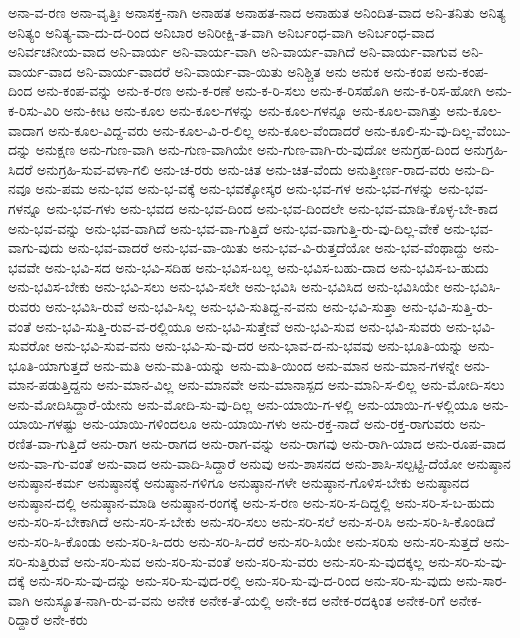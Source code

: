 ಅನಾ-ವ-ರಣ
ಅನಾ-ವೃತ್ತಿಃ
ಅನಾಸಕ್ತ-ನಾಗಿ
ಅನಾಹತ
ಅನಾಹತ-ನಾದ
ಅನಾಹುತ
ಅನಿಂದಿತ-ವಾದ
ಅನಿ-ತನಿತು
ಅನಿತ್ಯ
ಅನಿತ್ಯಂ
ಅನಿತ್ಯ-ವಾ-ದು-ದ-ರಿಂದ
ಅನಿಬಾರ
ಅನಿರೀಕ್ಷಿ-ತ-ವಾಗಿ
ಅನಿರ್ಬಂಧ-ವಾಗಿ
ಅನಿರ್ಬಂಧ-ವಾದ
ಅನಿರ್ವಚನೀಯ-ವಾದ
ಅನಿ-ವಾರ್ಯ
ಅನಿ-ವಾರ್ಯ-ವಾಗಿ
ಅನಿ-ವಾರ್ಯ-ವಾಗಿದೆ
ಅನಿ-ವಾರ್ಯ-ವಾಗುವ
ಅನಿ-ವಾರ್ಯ-ವಾದ
ಅನಿ-ವಾರ್ಯ-ವಾದರೆ
ಅನಿ-ವಾರ್ಯ-ವಾ-ಯಿತು
ಅನಿಶ್ಚಿತ
ಅನು
ಅನುಕ
ಅನು-ಕಂಪ
ಅನು-ಕಂಪ-ದಿಂದ
ಅನು-ಕಂಪ-ವನ್ನು
ಅನು-ಕ-ರಣ
ಅನು-ಕ-ರಣೆ
ಅನು-ಕ-ರಿ-ಸಲು
ಅನು-ಕ-ರಿಸಹೊಗಿ
ಅನು-ಕ-ರಿಸ-ಹೋಗಿ
ಅನು-ಕ-ರಿಸು-ವಿರಿ
ಅನು-ಕೀಟ
ಅನು-ಕೂಲ
ಅನು-ಕೂಲ-ಗಳನ್ನು
ಅನು-ಕೂಲ-ಗಳನ್ನೂ
ಅನು-ಕೂಲ-ವಾಗಿತ್ತು
ಅನು-ಕೂಲ-ವಾದಾಗ
ಅನು-ಕೂಲ-ವಿದ್ದ-ವರು
ಅನು-ಕೂಲ-ವಿ-ರ-ಲಿಲ್ಲ
ಅನು-ಕೂಲ-ವೆಂದಾದರೆ
ಅನು-ಕೂಲಿ-ಸು-ವು-ದಿಲ್ಲ-ವೆಂಬು-ದನ್ನು
ಅನುಕ್ಷಣ
ಅನು-ಗುಣ-ವಾಗಿ
ಅನು-ಗುಣ-ವಾಗಿಯೇ
ಅನು-ಗುಣ-ವಾಗಿ-ರು-ವುದೋ
ಅನುಗ್ರಹ-ದಿಂದ
ಅನುಗ್ರಹಿ-ಸಿದರೆ
ಅನುಗ್ರಹಿ-ಸುವ-ವಳಾ-ಗಲಿ
ಅನು-ಚ-ರರು
ಅನು-ಚಿತ
ಅನು-ಚಿತ-ವೆಂದು
ಅನುತ್ತೀರ್ಣ-ರಾದ-ವರು
ಅನು-ದಿ-ನವೂ
ಅನು-ಪಮ
ಅನು-ಭವ
ಅನು-ಭ-ವಕ್ಕೆ
ಅನು-ಭವಕ್ಕೋಸ್ಕರ
ಅನು-ಭವ-ಗಳ
ಅನು-ಭವ-ಗಳನ್ನು
ಅನು-ಭವ-ಗಳನ್ನೂ
ಅನು-ಭವ-ಗಳು
ಅನು-ಭವದ
ಅನು-ಭವ-ದಿಂದ
ಅನು-ಭವ-ದಿಂದಲೇ
ಅನು-ಭವ-ಮಾಡಿ-ಕೊಳ್ಳ-ಬೇ-ಕಾದ
ಅನು-ಭವ-ವನ್ನು
ಅನು-ಭವ-ವಾಗಿದೆ
ಅನು-ಭವ-ವಾ-ಗುತ್ತಿದೆ
ಅನು-ಭವ-ವಾಗುತ್ತಿ-ರು-ವು-ದಿಲ್ಲ-ವೇಕೆ
ಅನು-ಭವ-ವಾಗು-ವುದು
ಅನು-ಭವ-ವಾದರೆ
ಅನು-ಭವ-ವಾ-ಯಿತು
ಅನು-ಭವ-ವಿ-ರುತ್ತದೆಯೋ
ಅನು-ಭವ-ವೆಂಥಾದ್ದು
ಅನು-ಭವವೇ
ಅನು-ಭವಿ-ಸದ
ಅನು-ಭವಿ-ಸದಿಹ
ಅನು-ಭವಿಸ-ಬಲ್ಲ
ಅನು-ಭವಿಸ-ಬಹು-ದಾದ
ಅನು-ಭವಿಸ-ಬ-ಹುದು
ಅನು-ಭವಿಸ-ಬೇಕು
ಅನು-ಭವಿ-ಸಲು
ಅನು-ಭವಿ-ಸಲೇ
ಅನು-ಭವಿಸಿ
ಅನು-ಭವಿಸಿದ
ಅನು-ಭವಿಸಿಯೇ
ಅನು-ಭವಿಸಿ-ರುವರು
ಅನು-ಭವಿಸಿ-ರುವೆ
ಅನು-ಭವಿ-ಸಿಲ್ಲ
ಅನು-ಭವಿ-ಸುತಿದ್ದ-ನ-ವನು
ಅನು-ಭವಿ-ಸುತ್ತಾ
ಅನು-ಭವಿ-ಸುತ್ತಿ-ರು-ವಂತೆ
ಅನು-ಭವಿ-ಸುತ್ತಿ-ರುವ-ವ-ರಲ್ಲಿಯೂ
ಅನು-ಭವಿ-ಸುತ್ತೇವೆ
ಅನು-ಭವಿ-ಸುವ
ಅನು-ಭವಿ-ಸುವರು
ಅನು-ಭವಿ-ಸುವರೋ
ಅನು-ಭವಿ-ಸುವ-ವನು
ಅನು-ಭವಿ-ಸು-ವು-ದರ
ಅನು-ಭಾವ-ದ-ನು-ಭವವು
ಅನು-ಭೂತಿ-ಯನ್ನು
ಅನು-ಭೂತಿ-ಯಾಗುತ್ತದೆ
ಅನು-ಮತಿ
ಅನು-ಮತಿ-ಯನ್ನು
ಅನು-ಮತಿ-ಯಿಂದ
ಅನು-ಮಾನ
ಅನು-ಮಾನ-ಗಳನ್ನೇ
ಅನು-ಮಾನ-ಪಡುತ್ತಿದ್ದನು
ಅನು-ಮಾನ-ವಿಲ್ಲ
ಅನು-ಮಾನವೇ
ಅನು-ಮಾನಾಸ್ಪದ
ಅನು-ಮಾನಿ-ಸ-ಲಿಲ್ಲ
ಅನು-ಮೋದಿ-ಸಲು
ಅನು-ಮೋದಿಸಿದ್ದಾರೆ-ಯೇನು
ಅನು-ಮೋದಿ-ಸು-ವು-ದಿಲ್ಲ
ಅನು-ಯಾಯಿ-ಗ-ಳಲ್ಲಿ
ಅನು-ಯಾಯಿ-ಗ-ಳಲ್ಲಿಯೂ
ಅನು-ಯಾಯಿ-ಗಳಷ್ಟು
ಅನು-ಯಾಯಿ-ಗಳಿಂದಲೂ
ಅನು-ಯಾಯಿ-ಗಳು
ಅನು-ರಕ್ತ-ನಾದೆ
ಅನು-ರಕ್ತ-ರಾಗುವರು
ಅನು-ರಣಿತ-ವಾ-ಗುತ್ತಿದೆ
ಅನು-ರಾಗ
ಅನು-ರಾಗದ
ಅನು-ರಾಗ-ವನ್ನು
ಅನು-ರಾಗವು
ಅನು-ರಾಗಿ-ಯಾದ
ಅನು-ರೂಪ-ವಾದ
ಅನು-ವಾ-ಗು-ವಂತೆ
ಅನು-ವಾದ
ಅನು-ವಾದಿ-ಸಿದ್ದಾರೆ
ಅನುವು
ಅನು-ಶಾಸನದ
ಅನು-ಶಾಸಿ-ಸಲ್ಪಟ್ಟಿ-ದೆಯೋ
ಅನುಷ್ಠಾನ
ಅನುಷ್ಠಾನ-ಕರ್ಮ
ಅನುಷ್ಠಾನಕ್ಕೆ
ಅನುಷ್ಠಾನ-ಗಳಿಗೂ
ಅನುಷ್ಠಾನ-ಗಳೇ
ಅನುಷ್ಠಾನ-ಗೊಳಿಸ-ಬೇಕು
ಅನುಷ್ಠಾನದ
ಅನುಷ್ಠಾನ-ದಲ್ಲಿ
ಅನುಷ್ಠಾನ-ಮಾಡಿ
ಅನುಷ್ಠಾನ-ರಂಗಕ್ಕೆ
ಅನು-ಸ-ರಣ
ಅನು-ಸರಿ-ಸ-ದಿದ್ದಲ್ಲಿ
ಅನು-ಸರಿ-ಸ-ಬ-ಹುದು
ಅನು-ಸರಿ-ಸ-ಬೇಕಾಗಿದೆ
ಅನು-ಸರಿ-ಸ-ಬೇಕು
ಅನು-ಸರಿ-ಸಲು
ಅನು-ಸರಿ-ಸಲೆ
ಅನು-ಸ-ರಿಸಿ
ಅನು-ಸರಿ-ಸಿ-ಕೊಂಡಿದೆ
ಅನು-ಸರಿ-ಸಿ-ಕೊಂಡು
ಅನು-ಸರಿ-ಸಿ-ದರು
ಅನು-ಸರಿ-ಸಿ-ದರೆ
ಅನು-ಸರಿ-ಸಿಯೇ
ಅನು-ಸರಿಸು
ಅನು-ಸರಿ-ಸುತ್ತದೆ
ಅನು-ಸರಿ-ಸುತ್ತಿರುವೆ
ಅನು-ಸರಿ-ಸುವ
ಅನು-ಸರಿ-ಸು-ವಂತೆ
ಅನು-ಸರಿ-ಸು-ವರು
ಅನು-ಸರಿ-ಸು-ವುದಕ್ಕಲ್ಲ
ಅನು-ಸರಿ-ಸು-ವು-ದಕ್ಕೆ
ಅನು-ಸರಿ-ಸು-ವು-ದನ್ನು
ಅನು-ಸರಿ-ಸು-ವುದ-ರಲ್ಲಿ
ಅನು-ಸರಿ-ಸು-ವು-ದ-ರಿಂದ
ಅನು-ಸರಿ-ಸು-ವುದು
ಅನು-ಸಾರ-ವಾಗಿ
ಅನುಸ್ಯೂತ-ನಾಗಿ-ರು-ವ-ವನು
ಅನೇಕ
ಅನೇಕ-ತೆ-ಯಲ್ಲಿ
ಅನೇ-ಕದ
ಅನೇಕ-ರದಕ್ಕಿಂತ
ಅನೇಕ-ರಿಗೆ
ಅನೇಕ-ರಿದ್ದಾರೆ
ಅನೇ-ಕರು
